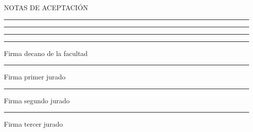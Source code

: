 \begin{center}
\bf{}
\end{center}

\vspace*{3\baselineskip}

NOTAS DE ACEPTACIÓN 
\vspace*{3\baselineskip}

\rule{80mm}{0.1mm}
\vspace*{1\baselineskip}

\rule{80mm}{0.1mm}
\vspace*{1\baselineskip}

\rule{80mm}{0.1mm}
\vspace*{5\baselineskip}

\rule{80mm}{0.1mm}
\vspace*{0.5\baselineskip}

Firma decano de la facultad
\vspace*{4\baselineskip}

\rule{80mm}{0.1mm}
\vspace*{0.5\baselineskip}

Firma primer jurado
\vspace*{4\baselineskip}

\rule{80mm}{0.1mm}
\vspace*{0.5\baselineskip}

Firma segundo jurado
\vspace*{4\baselineskip}

\rule{80mm}{0.1mm}
\vspace*{0.5\baselineskip}

Firma tercer jurado

